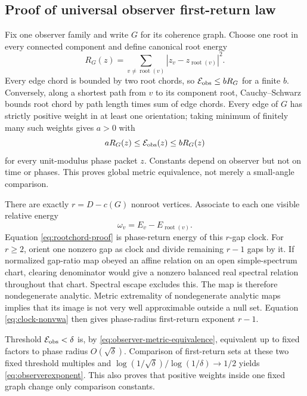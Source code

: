 \subsection{Proof of universal observer first-return law}
\label{app:universal-observer-exponent}

Fix one observer family and write $G$ for its coherence graph.  Choose one
root in every connected component and define canonical root energy
\begin{equation}
 R_G(z)=\sum_{v\ne\operatorname{root}(v)}
   |z_v-z_{\operatorname{root}(v)}|^2.                \label{eq:rootchord-proof}
\end{equation}
Every edge chord is bounded by two root chords, so
$\mathcal E_{\rm obs}\le bR_G$ for a finite $b$.  Conversely, along a
shortest path from $v$ to its component root, Cauchy--Schwarz bounds root
chord by path length times sum of edge chords.  Every edge of $G$ has
strictly positive weight in at least one orientation; taking minimum of
finitely many such weights gives $a>0$ with
\begin{equation}
 aR_G(z)\le\mathcal E_{\rm obs}(z)\le bR_G(z)          \label{eq:observer-metric-equivalence}
\end{equation}
for every unit-modulus phase packet $z$.  Constants depend on observer but
not on time or phases.  This proves global metric equivalence, not merely a
small-angle comparison.

There are exactly $r=D-c(G)$ nonroot vertices.  Associate to each one visible
relative energy
\[
 \omega_v=E_v-E_{\operatorname{root}(v)}.
\]
Equation \eqref{eq:rootchord-proof} is phase-return energy of this $r$-gap
clock.  For $r\ge2$, orient one nonzero gap as clock and divide remaining
$r-1$ gaps by it.  If normalized gap-ratio map obeyed an affine relation on
an open simple-spectrum chart, clearing denominator would give a nonzero
balanced real spectral relation throughout that chart.  Spectral escape
excludes this.  The map is therefore nondegenerate analytic.  Metric
extremality of nondegenerate analytic maps
\cite{KleinbockMargulis1998} implies that its image is not very well
approximable outside a null set.  Equation \eqref{eq:clock-nonvwa} then gives
phase-radius first-return exponent $r-1$.

Threshold $\mathcal E_{\rm obs}<\delta$ is, by
\eqref{eq:observer-metric-equivalence}, equivalent up to fixed factors to
phase radius $O(\sqrt\delta)$.  Comparison of first-return sets at these two
fixed threshold multiples and
$\log(1/\sqrt\delta)/\log(1/\delta)\to1/2$ yields
\eqref{eq:observerexponent}.  This also proves that positive weights inside
one fixed graph change only comparison constants.

